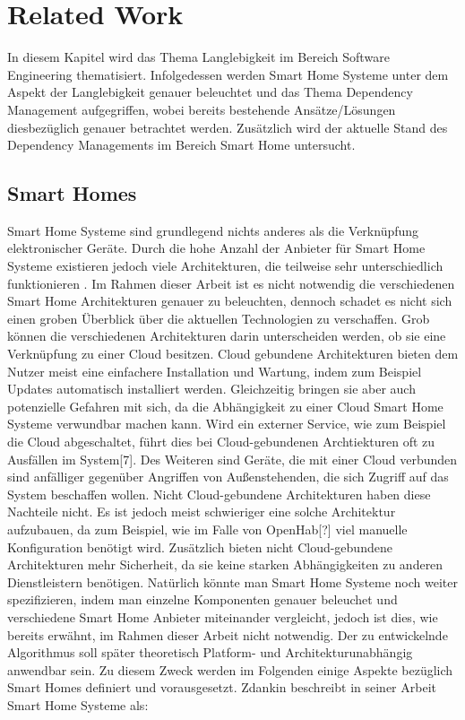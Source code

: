\chapter{Related Work}\label{ch:related_work}
In diesem Kapitel wird das Thema Langlebigkeit im Bereich Software Engineering thematisiert. Infolgedessen werden
Smart Home Systeme unter dem Aspekt der Langlebigkeit genauer beleuchtet und  das Thema Dependency Management aufgegriffen, wobei bereits 
bestehende Ansätze/Lösungen diesbezüglich genauer betrachtet werden. Zusätzlich wird der aktuelle Stand des Dependency Managements im 
Bereich Smart Home untersucht.


\section{Smart Homes}
Smart Home Systeme sind grundlegend nichts anderes als die Verknüpfung elektronischer Geräte. Durch die hohe Anzahl 
der Anbieter für Smart Home Systeme existieren jedoch viele Architekturen, die teilweise sehr unterschiedlich funktionieren .
Im Rahmen dieser Arbeit ist es nicht notwendig die verschiedenen Smart Home Architekturen genauer zu beleuchten,
dennoch schadet es nicht sich einen groben Überblick über die aktuellen Technologien zu verschaffen. Grob können die
verschiedenen Architekturen darin unterscheiden werden, ob sie eine Verknüpfung zu einer Cloud besitzen. Cloud gebundene
Architekturen bieten dem Nutzer meist eine einfachere Installation und Wartung, indem zum 
Beispiel Updates automatisch installiert werden. Gleichzeitig bringen sie aber auch potenzielle Gefahren mit sich, da die
Abhängigkeit zu einer Cloud Smart Home Systeme verwundbar machen kann. Wird ein externer Service, wie zum
Beispiel die Cloud abgeschaltet, führt dies bei Cloud-gebundenen Archtiekturen oft zu Ausfällen im System[7].
Des Weiteren sind Geräte, die mit einer Cloud verbunden sind anfälliger gegenüber Angriffen von Außenstehenden, die sich 
Zugriff auf das System beschaffen wollen.
Nicht Cloud-gebundene Architekturen haben diese Nachteile nicht. Es ist jedoch meist schwieriger eine solche Architektur aufzubauen, 
da zum Beispiel, wie im Falle von OpenHab[?] viel manuelle Konfiguration benötigt wird. Zusätzlich bieten nicht Cloud-gebundene Architekturen
mehr Sicherheit, da sie keine starken Abhängigkeiten zu anderen Dienstleistern benötigen.
Natürlich könnte man Smart Home Systeme noch weiter spezifizieren, indem man einzelne Komponenten genauer beleuchet und 
verschiedene Smart Home Anbieter miteinander vergleicht, jedoch ist dies, wie bereits erwähnt, im Rahmen dieser 
Arbeit nicht notwendig. Der zu entwickelnde Algorithmus soll später theoretisch Platform- und Architekturunabhängig anwendbar sein.
Zu diesem Zweck werden im Folgenden einige Aspekte bezüglich Smart Homes definiert und vorausgesetzt. 
Zdankin beschreibt in seiner Arbeit Smart Home Systeme als:

